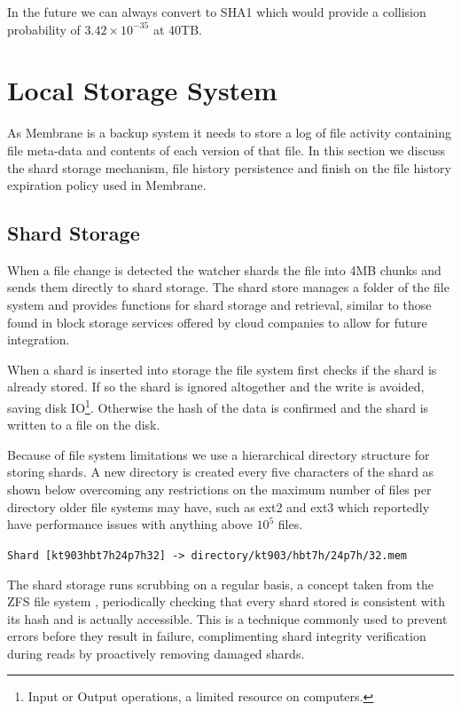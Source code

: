 \documentclass[11pt, a4paper, twoside]{report}
\def\code#1{\texttt{#1}}
\begin{document}
In the future we can always convert to SHA1 which would provide a collision probability of $3.42 \times 10^{-35}$ at 40TB.

\section{Local Storage System}

As Membrane is a backup system it needs to store a log of file activity containing file meta-data and contents of each version of that file. In this section we discuss the shard storage mechanism, file history persistence and finish on the file history expiration policy used in Membrane.

\subsection{Shard Storage}

When a file change is detected the watcher shards the file into 4MB chunks and sends them directly to shard storage. The shard store manages a folder of the file system and provides functions for shard storage and retrieval, similar to those found in block storage services offered by cloud companies to allow for future integration.

When a shard is inserted into storage the file system first checks if the shard is already stored. If so the shard is ignored altogether and the write is avoided, saving disk IO\footnote{Input or Output operations, a limited resource on computers.}. Otherwise the hash of the data is confirmed and the shard is written to a file on the disk.

Because of file system limitations we use a hierarchical directory structure for storing shards. A new directory is created every five characters of the shard as shown below overcoming any restrictions on the maximum number of files per directory older file systems may have, such as ext2 and ext3 which reportedly have performance issues with anything above $10^5$ files. \citep{johnson2014files}

\begin{displayquote}
 \code{Shard [kt903hbt7h24p7h32] -> directory/kt903/hbt7h/24p7h/32.mem}
\end{displayquote}

The shard storage runs scrubbing on a regular basis, a concept taken from the ZFS file system \citep{oracle2012zfs}, periodically checking that every shard stored is consistent with its hash and is actually accessible. This is a technique commonly used to prevent errors before they result in failure, complimenting shard integrity verification during reads by proactively removing damaged shards.
\end{document}
